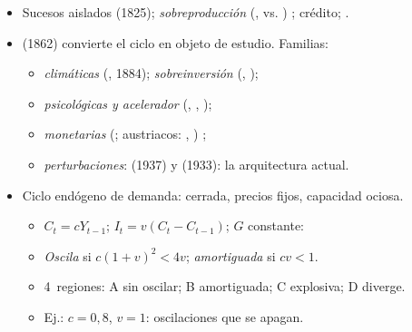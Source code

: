 \documentclass{article}
\begin{document}
\begin{columnas}
\begin{itemize}
\item Sucesos aislados (1825); \emph{sobreproducción} (,  vs. ) ; crédito; .
\end{itemize}
\begin{itemize}
\item {} (1862) convierte el ciclo en objeto de estudio. Familias:
  \begin{itemize}
  \item \emph{climáticas} (, 1884); \emph{sobreinversión} (, );
  \item \emph{psicológicas y acelerador} (, , );
  \item \emph{monetarias} (; austriacos: , ) ;
  \item \emph{perturbaciones}:  (1937) y  (1933): la arquitectura actual.
  \end{itemize}
\end{itemize}
\begin{itemize}
\item Ciclo endógeno de demanda: cerrada, precios fijos, capacidad ociosa.
  \begin{itemize}
  \item $C_t=cY_{t-1}$; $I_t=v(C_t-C_{t-1})$; $G$ constante:
  \end{itemize}
  \begin{itemize}
  \item \emph{Oscila} si $c(1+v)^2<4v$; \emph{amortiguada} si $cv<1$.
  \item 4~regiones: A sin oscilar; B amortiguada; C explosiva; D diverge.
  \item Ej.: $c=0{,}8$, $v=1$: oscilaciones que se apagan.
  \end{itemize}
\end{itemize}
\begin{itemize}

\end{itemize}
\end{columnas}
\end{document}
